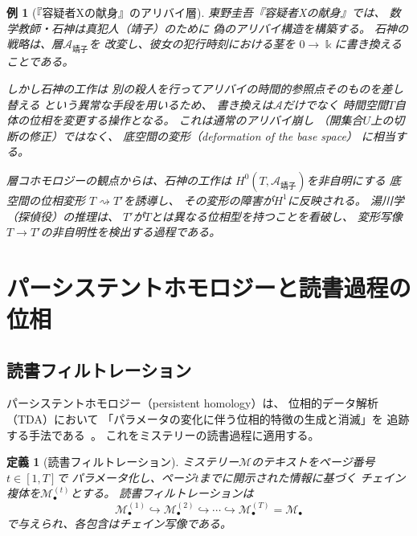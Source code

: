 \documentclass[12pt,twocolumn]{ltjsarticle}
\newtheorem{definition}[theorem]{定義}
\newtheorem{example}[theorem]{例}
\newcommand{\Mys}{\mathcal{M}}
\newcommand{\kk}{\Bbbk}
\begin{document}
\begin{example}[『容疑者Xの献身』のアリバイ層]
\label{ex:yogisha_alibi}
東野圭吾『容疑者Xの献身』では、
数学教師・石神は真犯人（靖子）のために
\emph{偽のアリバイ構造}を構築する。
石神の戦略は、層$\mathcal{A}_{\text{靖子}}$を
改変し、彼女の犯行時刻における茎を
$0 \to \kk$に書き換えることである。

しかし石神の工作は
\emph{別の殺人を行ってアリバイの時間的参照点そのものを差し替える}
という異常な手段を用いるため、
書き換えは$\mathcal{A}$だけでなく
時間空間$T$自体の位相を変更する操作となる。
これは通常のアリバイ崩し
（開集合$U$上の切断の修正）ではなく、
\emph{底空間の変形}（deformation of the base space）
に相当する。

層コホモロジーの観点からは、石神の工作は
$H^0(T, \mathcal{A}_{\text{靖子}})$を非自明にする
\emph{底空間の位相変形}
$T \rightsquigarrow T'$を誘導し、
その変形の障害が$H^1$に反映される。
湯川学（探偵役）の推理は、
$T'$が$T$とは異なる位相型を持つことを看破し、
変形写像$T \to T'$の非自明性を検出する過程である。
\end{example}


\section{パーシステントホモロジーと読書過程の位相}
\label{sec:persistent}

\subsection{読書フィルトレーション}

パーシステントホモロジー（persistent homology）は、
位相的データ解析（TDA）において
「パラメータの変化に伴う位相的特徴の生成と消滅」を
追跡する手法である~\cite{Carlsson2009, Edelsbrunner2010}。
これをミステリーの読書過程に適用する。

\begin{definition}[読書フィルトレーション]
\label{def:reading_filtration}
ミステリー$\Mys$のテキストをページ番号$t \in [1, T]$で
パラメータ化し、ページ$t$までに開示された情報に基づく
チェイン複体を$\Mys_\bullet^{(t)}$とする。
読書フィルトレーションは
\begin{equation}
\Mys_\bullet^{(1)} \hookrightarrow \Mys_\bullet^{(2)}
\hookrightarrow \cdots \hookrightarrow \Mys_\bullet^{(T)} = \Mys_\bullet
\end{equation}
で与えられ、各包含はチェイン写像である。
\end{definition}
\end{document}
